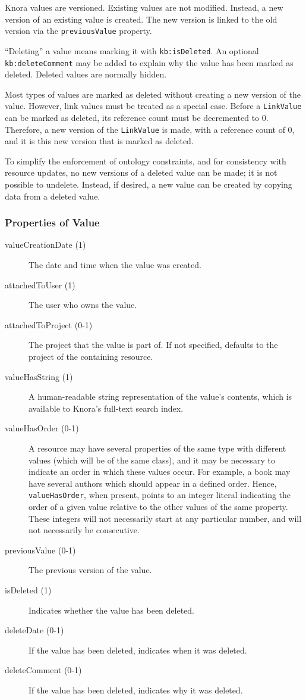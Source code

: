 \documentclass[12pt, a4paper]{article}
\begin{document}
Knora values are versioned. Existing values are not modified. Instead, a new version of an existing value is created. The new version is linked to the old version via the \texttt{previousValue} property.

\enquote{Deleting} a value means marking it with \texttt{kb:is\-Deleted}. An optional \texttt{kb:delete\-Comment} may be added to explain why the value has been marked as deleted. Deleted values are normally hidden.

Most types of values are marked as deleted without creating a new version of the value. However, link values must be treated as a special case. Before a \texttt{LinkValue} can be marked as deleted, its reference count must be decremented to 0. Therefore, a new version of the \texttt{LinkValue} is made, with a reference count of 0, and it is this new version that is marked as deleted.

To simplify the enforcement of ontology constraints, and for consistency with resource updates, no new versions of a deleted value can be made; it is not possible to undelete. Instead, if desired, a new value can be created by copying data from a deleted value.

\subsubsection{Properties of Value}

\begin{description}
  \item[valueCreationDate (1)] The date and time when the value was created.
  \item[attachedToUser (1)] The user who owns the value.
  \item[attachedToProject (0-1)] The project that the value is part of. If not specified, defaults to the project of the containing resource.
  \item[valueHasString (1)] A human-readable string representation of the value's contents, which is available to Knora's full-text search index.
  \item[valueHasOrder (0-1)] A resource may have several properties of the same type with different values (which will be of the same class), and it may be necessary to indicate an order in which these values occur. For example, a book may have several authors which should appear in a defined order. Hence, \texttt{valueHasOrder}, when present, points to an integer literal indicating the order of a given value relative to the other values of the same property. These integers will not necessarily start at any particular number, and will not necessarily be consecutive.
  \item[previousValue (0-1)] The previous version of the value.
  \item[isDeleted (1)] Indicates whether the value has been deleted.
  \item[deleteDate (0-1)] If the value has been deleted, indicates when it was deleted.
  \item[deleteComment (0-1)] If the value has been deleted, indicates why it was deleted.
\end{description}
\end{document}
